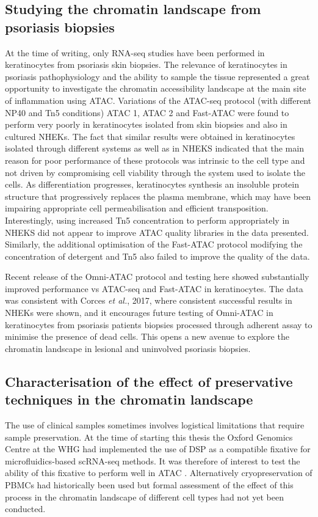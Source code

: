 \subsection{Studying the chromatin landscape from psoriasis biopsies}
At the time of writing, only RNA-seq studies have been performed in keratinocytes from psoriasis skin biopsies. The relevance of keratinocytes in psoriasis pathophysiology and the ability to sample the tissue represented a great opportunity to investigate the chromatin accessibility landscape at the main site of inflammation using ATAC. Variations of the ATAC-seq protocol (with different NP40 and Tn5 conditions) ATAC 1, ATAC 2 and Fast-ATAC were found to perform very poorly in keratinocytes isolated from skin biopsies and also in cultured NHEKs. The fact that similar results were obtained in keratinocytes isolated through different systems as well as in NHEKS indicated that the main reason for poor performance of these protocols was intrinsic to the cell type and not driven by compromising cell viability through the system used to isolate the cells. As differentiation progresses, keratinocytes synthesis an insoluble protein structure that progressively replaces the plasma membrane, which may have been impairing appropriate cell permeabilisation and efficient transposition. Interestingly, using increased Tn5 concentration to perform appropriately in NHEKS did not appear to improve ATAC quality libraries in the data presented. Similarly, the additional optimisation of the Fast-ATAC protocol modifying the concentration of detergent and Tn5 also failed to improve the quality of the data.

Recent release of the Omni-ATAC protocol and testing here showed substantially improved performance vs ATAC-seq and Fast-ATAC in keratinocytes. The data was consistent with Corces \textit{et al.}, 2017, where consistent successful results in NHEKs were shown, and it encourages future testing of Omni-ATAC in keratinocytes from psoriasis patients biopsies processed through adherent assay to minimise the presence of dead cells. This opens a new avenue to explore the chromatin landscape in lesional and uninvolved psoriasis biopsies.


\subsection{Characterisation of the effect of preservative techniques in the chromatin landscape}
The use of clinical samples sometimes involves logistical limitations that require sample preservation. At the time of starting this thesis the Oxford Genomics Centre at the WHG had implemented the use of DSP as a compatible fixative for microfluidics-based scRNA-seq methods. It was therefore of interest to test the ability of this fixative to perform well in ATAC \parencite{Attar2018}. Alternatively cryopreservation of PBMCs had historically been used but formal assessment of the effect of this process in the chromatin landscape of different cell types had not yet been conducted.

